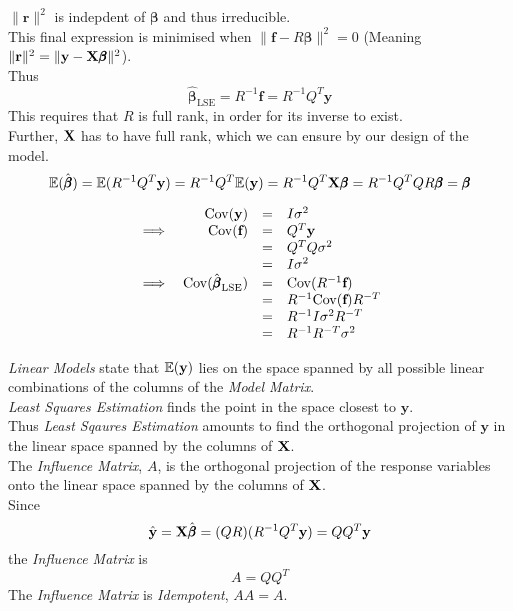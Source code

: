 \documentclass[11pt,a4paper]{article}
\begin{document}
$\|\textbf{r}\|^2$ is indepdent of $\pmb\beta$ and thus irreducible.\\
This final expression is minimised when $\|\textbf{f}-R\pmb\beta\|^2=0$ (Meaning $\|\textbf{r}\|^2=\|\textbf{y}-\textbf{X}\pmb\beta\|^2$).\\
Thus
$$\hat{\pmb\beta}_\text{LSE}=R^{-1}\textbf{f}=R^{-1}Q^T\textbf{y}$$
This requires that $R$ is full rank, in order for its inverse to exist.\\
Further, $\textbf{X}$ has to have full rank, which we can ensure by our design of the model.\\

$$\mathbb{E}(\hat{\pmb\beta})=\mathbb{E}(R^{-1}Q^T\textbf{y})=R^{-1}Q^T\mathbb{E}(\textbf{y})=R^{-1}Q^T\textbf{X}\pmb\beta=R^{-1}Q^TQR\pmb\beta=\pmb\beta$$

\[\begin{array}{rrcl}
&\mathrm{Cov}(\textbf{y})&=&I\sigma^2\\
\implies&\mathrm{Cov}(\textbf{f})&=&Q^T\textbf{y}\\
&&=&Q^TQ\sigma^2\\
&&=&I\sigma^2\\
\implies&\mathrm{Cov}(\hat{\pmb\beta}_\text{LSE})&=&\mathrm{Cov}(R^{-1}\textbf{f})\\
&&=&R^{-1}\mathrm{Cov}(\textbf{f})R^{-T}\\
&&=&R^{-1}I\sigma^2R^{-T}\\
&&=&R^{-1}R^{-T}\sigma^2
\end{array}\]

\textit{Linear Models} state that $\mathbb{E}(\textbf{y})$ lies on the space spanned by all possible linear combinations of the columns of the \textit{Model Matrix}.\\
\textit{Least Squares Estimation} finds the point in the space closest to $\textbf{y}$.\\
Thus \textit{Least Sqaures Estimation} amounts to find the orthogonal projection of $\textbf{y}$ in the linear space spanned by the columns of $\textbf{X}$.\\

The \textit{Influence Matrix}, $A$, is the orthogonal projection of the response variables onto the linear space spanned by the columns of $\textbf{X}$.\\
Since
$$\hat{\textbf{y}}=\textbf{X}\hat{\pmb\beta}=(QR)(R^{-1}Q^T\textbf{y})=QQ^T\textbf{y}$$
the \textit{Influence Matrix} is
$$A=QQ^T$$
\nb The \textit{Influence Matrix} is \textit{Idempotent}, $AA=A$.\\
\end{document}
